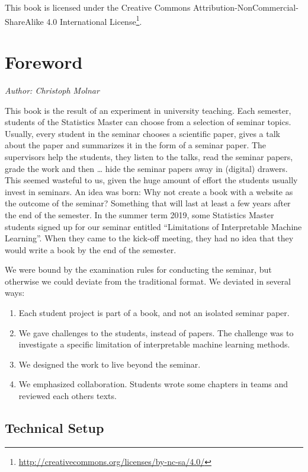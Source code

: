 \documentclass[]{krantz}
\providecommand{\tightlist}{%
  \setlength{\itemsep}{0pt}\setlength{\parskip}{0pt}}
\renewcommand{\href}[2]{#2\footnote{\url{#1}}}
\begin{document}
This book is licensed under the
\href{http://creativecommons.org/licenses/by-nc-sa/4.0/}{Creative
Commons Attribution-NonCommercial-ShareAlike 4.0 International License}.

\mainmatter

\chapter*{Foreword}\label{foreword}


\emph{Author: Christoph Molnar}

This book is the result of an experiment in university teaching. Each
semester, students of the Statistics Master can choose from a selection
of seminar topics. Usually, every student in the seminar chooses a
scientific paper, gives a talk about the paper and summarizes it in the
form of a seminar paper. The supervisors help the students, they listen
to the talks, read the seminar papers, grade the work and then \ldots{}
hide the seminar papers away in (digital) drawers. This seemed wasteful
to us, given the huge amount of effort the students usually invest in
seminars. An idea was born: Why not create a book with a website as the
outcome of the seminar? Something that will last at least a few years
after the end of the semester. In the summer term 2019, some Statistics
Master students signed up for our seminar entitled ``Limitations of
Interpretable Machine Learning''. When they came to the kick-off
meeting, they had no idea that they would write a book by the end of the
semester.

We were bound by the examination rules for conducting the seminar, but
otherwise we could deviate from the traditional format. We deviated in
several ways:

\begin{enumerate}
\def\labelenumi{\arabic{enumi}.}
\tightlist
\item
  Each student project is part of a book, and not an isolated seminar
  paper.
\item
  We gave challenges to the students, instead of papers. The challenge
  was to investigate a specific limitation of interpretable machine
  learning methods.
\item
  We designed the work to live beyond the seminar.
\item
  We emphasized collaboration. Students wrote some chapters in teams and
  reviewed each others texts.
\end{enumerate}

\section*{Technical Setup}\label{technical-setup}
\end{document}
